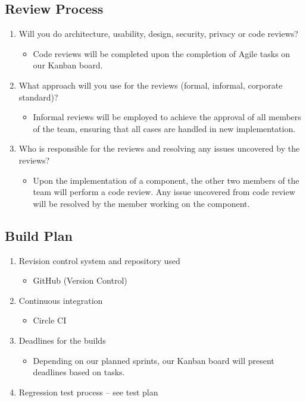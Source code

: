 \subsection{Review Process} 
\begin{enumerate}
\item Will you do architecture, usability, design, security, privacy or code reviews?
    \begin{itemize}
        \item Code reviews will be completed upon the completion of Agile tasks on our Kanban board.
    \end{itemize}

\item What approach will you use for the reviews (formal, informal, corporate standard)? 
    \begin{itemize}
        \item Informal reviews will be employed to achieve the approval of all members of the team, ensuring that all cases are handled in new implementation.
    \end{itemize}
\item Who is responsible for the reviews and resolving any issues uncovered by the reviews? 
    \begin{itemize}
        \item Upon the implementation of a component, the other two members of the team will perform a code review. Any issue uncovered from code review will be resolved by the member working on the component.
    \end{itemize}
\end{enumerate}

\subsection{Build Plan} 
\begin{enumerate}
\item Revision control system and repository used
    \begin{itemize}
        \item GitHub (Version Control)
    \end{itemize}
\item Continuous integration 
    \begin{itemize}
        \item Circle CI
    \end{itemize}
\item Deadlines for the builds
    \begin{itemize}
        \item Depending on our planned sprints, our Kanban board will present deadlines based on tasks.
    \end{itemize}
\item Regression test process – see test plan 
\end{enumerate}

